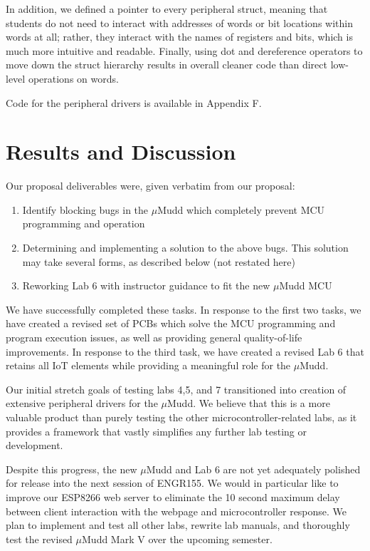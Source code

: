 \documentclass[12pt]{article}
\begin{document}
    In addition, we defined a pointer to every peripheral struct, meaning that students do not need to interact with addresses of words or bit locations within words at all; rather, they interact with the names of registers and bits, which is much more intuitive and readable. Finally, using dot and dereference operators to move down the struct hierarchy results in overall cleaner code than direct low-level operations on words.
    
    Code for the peripheral drivers is available in Appendix F.


\section{Results and Discussion}
Our proposal deliverables were, given verbatim from our proposal:

\begin{enumerate}
    \item Identify blocking bugs in the $\mu$Mudd which completely prevent MCU programming and operation
    \item Determining and implementing a solution to the above bugs. This solution may take several forms, as described below (not restated here)
    \item Reworking Lab 6 with instructor guidance to fit the new $\mu$Mudd MCU
\end{enumerate}

We have successfully completed these tasks. In response to the first two tasks, we have created a revised set of PCBs which solve the MCU programming and program execution issues, as well as providing general quality-of-life improvements. In response to the third task, we have created a revised Lab 6 that retains all IoT elements while providing a meaningful role for the $\mu$Mudd.

Our initial stretch goals of testing labs 4,5, and 7 transitioned into creation of extensive peripheral drivers for the $\mu$Mudd. We believe that this is a more valuable product than purely testing the other microcontroller-related labs, as it provides a framework that vastly simplifies any further lab testing or development. 

Despite this progress, the new $\mu$Mudd and Lab 6 are not yet adequately polished for release into the next session of ENGR155. We would in particular like to improve our ESP8266 web server to eliminate the 10 second maximum delay between client interaction with the webpage and microcontroller response. We plan to implement and test all other labs, rewrite lab manuals, and thoroughly test the revised $\mu$Mudd Mark V over the upcoming semester.
\end{document}
